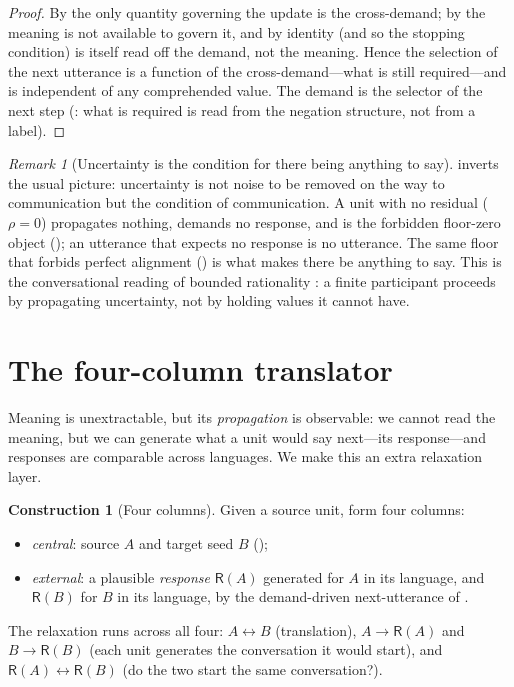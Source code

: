 \documentclass[twocolumn,11pt,a4paper]{article}
\theoremstyle{sup}
\theoremstyle{definition}
\newtheorem{construction}[theorem]{Construction}
\theoremstyle{remark}
\newtheorem{remark}[theorem]{Remark}
\newcommand{\res}{\rho}
\newcommand{\colA}{A}
\newcommand{\colB}{B}
\newcommand{\Resp}{\mathsf{R}}
\begin{document}
\begin{proof}
By  the only quantity governing the update is the cross-demand;
by  the meaning is not available to govern it, and by
 identity (and so the stopping condition) is itself read off
the demand, not the meaning. Hence the selection of the next utterance is a
function of the cross-demand---what is still required---and is independent of any
comprehended value. The demand is the selector of the next step
(: what is required is read from the negation structure,
not from a label).
\end{proof}

\begin{remark}[Uncertainty is the condition for there being anything to say]
\label{rem:condition}
 inverts the usual picture: uncertainty is not noise to be
removed on the way to communication but the condition of communication. A unit
with no residual ($\res=0$) propagates nothing, demands no response, and is the
forbidden floor-zero object (); an utterance that expects no
response is no utterance. The same floor that forbids perfect alignment
() is what makes there be anything to say. This is the
conversational reading of bounded rationality \citep{simon1955}: a finite
participant proceeds by propagating uncertainty, not by holding values it cannot
have.
\end{remark}

\section{The four-column translator}
\label{sec:four}

Meaning is unextractable, but its \emph{propagation} is observable: we cannot
read the meaning, but we can generate what a unit would say next---its
response---and responses are comparable across languages. We make this an extra
relaxation layer.

\begin{construction}[Four columns]
\label{con:four}
Given a source unit, form four columns:
\begin{itemize}[leftmargin=1.3em,itemsep=1pt]
\item \emph{central}: source $\colA$ and target seed $\colB$ ();
\item \emph{external}: a plausible \emph{response} $\Resp(\colA)$ generated for
$\colA$ in its language, and $\Resp(\colB)$ for $\colB$ in its language, by the
demand-driven next-utterance of .
\end{itemize}
The relaxation runs across all four: $\colA\leftrightarrow\colB$ (translation),
$\colA\!\to\!\Resp(\colA)$ and $\colB\!\to\!\Resp(\colB)$ (each unit generates the
conversation it would start), and $\Resp(\colA)\leftrightarrow\Resp(\colB)$ (do
the two start the same conversation?).
\end{construction}
\end{document}
